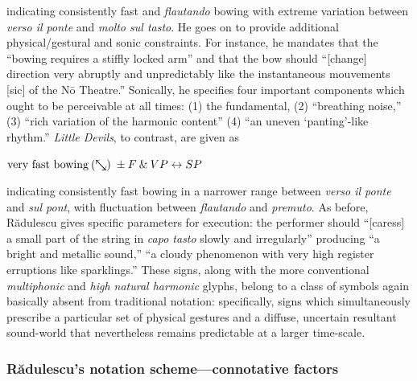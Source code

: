         \noindent indicating consistently fast and \textit{flautando} bowing with extreme variation between \textit{verso il ponte} and \textit{molto sul tasto}. He goes on to provide additional physical/gestural and sonic constraints. For instance, he mandates that the ``bowing requires a stiffly locked arm'' and that the bow should ``[change] direction very abruptly and unpredictably like the instantaneous mouvements [sic] of the Nō Theatre.'' Sonically, he specifies four important components which ought to be perceivable at all times: (1) the fundamental, (2) ``breathing noise,'' (3) ``rich variation of the harmonic content'' (4) ``an uneven `panting'-like rhythm.''\autocite[Instruction pg. 2]{Radulescu_1984} \textit{Little Devils}, to contrast, are given as

        \begin{center}
            $\text{very fast bowing} \: (\nwsearrownew) \; \pm F \: \& \: VP \leftrightarrow SP$
        \end{center}

        \noindent indicating consistently fast bowing in a narrower range between \textit{verso il ponte} and \textit{sul pont}, with fluctuation between \textit{flautando} and \textit{premuto}. As before, R\u{a}dulescu gives specific parameters for execution: the performer should ``[caress] a small part of the string in \textit{capo tasto} slowly and irregularly'' producing ``a bright and metallic sound,'' ``a cloudy phenomenon with very high register erruptions like sparklings.''\autocite[Instruction pg. 2]{Radulescu_1984} These signs, along with the more conventional \textit{multiphonic} and \textit{high natural harmonic} glyphs, belong to a class of symbols again basically absent from traditional notation: specifically, signs which simultaneously prescribe a particular set of physical gestures and a diffuse, uncertain resultant sound-world that nevertheless remains predictable at a larger time-scale.
        
    \subsubsection{Rădulescu's notation scheme---connotative factors}

